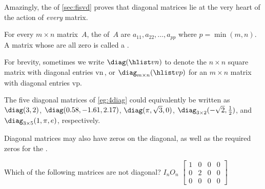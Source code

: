 Amazingly, the  of \cref{sec:fisvd} proves that diagonal matrices lie at the very heart of the action of \emph{every} matrix.

\begin{definition} \label{def:diag} 
For every \(m\times n\) matrix~\(A\), the  of~\(A\) are \(a_{11},a_{22},\ldots,a_{pp}\) where \(p=\min(m,n)\).
A matrix whose  are all zero is called a .

For brevity, sometimes we write \(\diag(\hlist vn)\) to denote the \(n\times n\) square matrix with diagonal entries \hlist vn\,, or \(\diag_{m\times n}(\hlist vp)\) for an \(m\times n\) matrix with diagonal entries \hlist vp.
\end{definition}

\begin{example}  \sloppy
The five diagonal matrices of \cref{eg:4diag} could equivalently be written as \(\diag(3,2)\), \(\diag(0.58,-1.61,2.17)\), \(\diag(\pi,\sqrt3,0)\), \(\diag_{3\times2}(-\sqrt2,\tfrac12)\), and \(\diag_{3\times5}(1,\pi,e)\), respectively.
\end{example}


Diagonal matrices may also have zeros on the diagonal, as well as the 
required zeros for the .


\begin{activity}
Which of the following matrices are not diagonal?
{\(I_n\)}{\(O_n\)}
{\(\begin{bmatrix} 1&0&0&0
\\0&2&0&0
\\0&0&0&0 \end{bmatrix}\)}
\end{activity}
  


